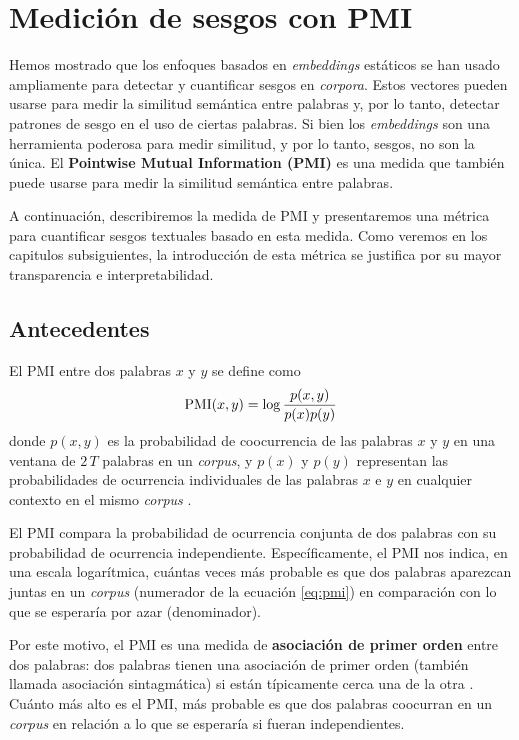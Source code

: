 
\chapter{Medición de sesgos con PMI} \label{cap:bias_pmi}

Hemos mostrado que los enfoques basados en \emph{embeddings} estáticos se han usado ampliamente para detectar y cuantificar sesgos en \emph{corpora}. Estos vectores pueden usarse para medir la similitud semántica entre palabras y, por lo tanto, detectar patrones de sesgo en el uso de ciertas palabras. Si bien los \emph{embeddings} son una herramienta poderosa para medir similitud, y por lo tanto, sesgos, no son la única. El \textbf{Pointwise Mutual Information (PMI)} es una medida que también puede usarse para medir la similitud semántica entre palabras. 

A continuación, describiremos la medida de PMI y presentaremos una métrica para cuantificar sesgos textuales basado en esta medida. Como veremos en los capitulos subsiguientes, la introducción de esta métrica se justifica por su mayor transparencia e interpretabilidad.

\section{Antecedentes} \label{sec:pmi_intro}


El PMI entre dos palabras $x$ y $y$ se define como
%
\begin{equation} \label{eq:pmi}
    \operatorname{PMI}(x,y) = \log \frac{p(x,y)}{p(x)p(y)} 
\end{equation}
%
donde $p(x,y)$ es la probabilidad de coocurrencia de las palabras $x$ y $y$ en una ventana de $2\,T$ palabras en un \emph{corpus}, y $p(x)$ y $p(y)$ representan las probabilidades de ocurrencia individuales de las palabras $x$ e $y$ en cualquier contexto en el mismo \emph{corpus} \citep{church1990word}.

El PMI compara la probabilidad de ocurrencia conjunta de dos palabras con su probabilidad de ocurrencia independiente. Específicamente, el PMI nos indica, en una escala logarítmica, cuántas veces más probable es que dos palabras aparezcan juntas en un \emph{corpus} (numerador de la ecuación \ref{eq:pmi}) en comparación con lo que se esperaría por azar (denominador).  

Por este motivo, el PMI es una medida de \textbf{asociación de primer orden} entre dos palabras: dos palabras tienen una asociación de primer orden (también llamada asociación sintagmática) si están típicamente cerca una de la otra \citep{jurafsky2000speech}. Cuánto más alto es el PMI, más probable es que dos palabras coocurran en un \emph{corpus} en relación a lo que se esperaría si fueran independientes.

